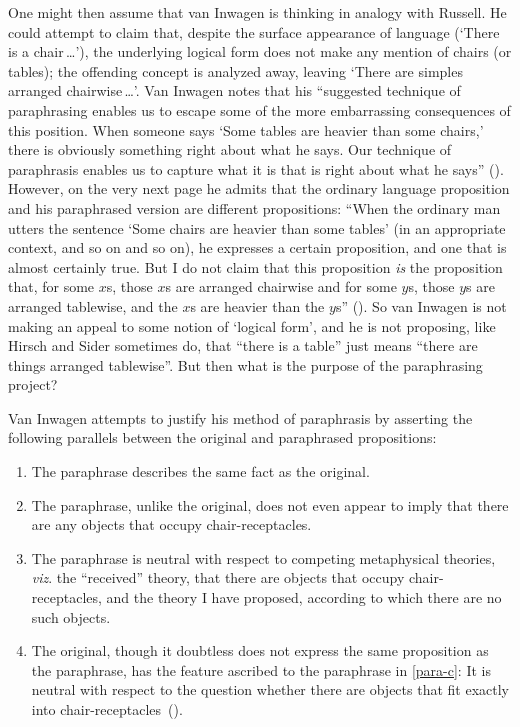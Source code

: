 \documentclass[11pt]{article}
\begin{document}
\begin{spacing}{1.5}
One might then assume that van Inwagen is thinking in analogy with
Russell.  He could attempt to claim that, despite the surface
appearance of language (`There is a chair\,\ldots '), the underlying
logical form does not make any mention of chairs (or tables); the
offending concept is analyzed away, leaving `There are simples
arranged chairwise\,\ldots '.  Van Inwagen notes that his ``suggested
technique of paraphrasing enables us to escape some of the more
embarrassing consequences of this position.  When someone says `Some
tables are heavier than some chairs,' there is obviously something
right about what he says.  Our technique of paraphrasis enables us to
capture what it is that is right about what he says''
(\citeyear[111]{inwagen1995}).  However, on the very next page he
admits that the ordinary language proposition and his paraphrased
version are different propositions: ``When the ordinary man utters the
sentence `Some chairs are heavier than some tables' (in an appropriate
context, and so on and so on), he expresses a certain proposition, and
one that is almost certainly true.  But I do not claim that this
proposition {\em is} the proposition that, for some $x$s, those $x$s
are arranged chairwise and for some $y$s, those $y$s are arranged
tablewise, and the $x$s are heavier than the $y$s''
(\citeyear[112]{inwagen1995}).  So van Inwagen is not making an appeal
to some notion of `logical form', and he is not proposing, like Hirsch
and Sider sometimes do, that ``there is a table'' just means ``there
are things arranged tablewise''.  But then what is the purpose of the
paraphrasing project?

Van Inwagen attempts to justify his method of paraphrasis by asserting
the following parallels between the original and paraphrased
propositions:
\begin{enumerate}[ref=(\arabic*)]
	\item The paraphrase describes the same fact as the
          original.  \label{para-a}
	\item The paraphrase, unlike the original, does not even
          appear to imply that there are any objects that occupy
          chair-receptacles.  \label{para-b}
	\item The paraphrase is neutral with respect to competing
          metaphysical theories, {\em viz}.  the ``received'' theory,
          that there are objects that occupy chair-receptacles, and
          the theory I have proposed, according to which there are no
          such objects.  \label{para-c}
	\item The original, though it doubtless does not express the
          same proposition as the paraphrase, has the feature ascribed
          to the paraphrase in \ref{para-c}: It is neutral with
          respect to the question whether there are objects that fit
          exactly into
          chair-receptacles~(\citeyear[113]{inwagen1995}).  \label{para-d}
\end{enumerate}


\end{spacing}
\end{document}
